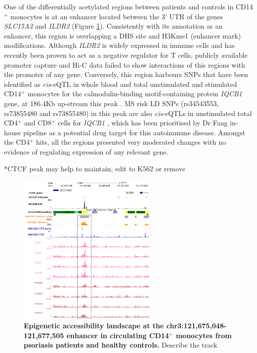 One of the differentially acetylated regions between patients and controls in CD14$^+$ monocytes is at an enhancer located between the 3' UTR of the genes \textit{SLC15A2} and \textit{ILDR2} (Figure \ref{figure:ChIPm_H3K27ac_UCSC_ILDR1_track}). Consistently with its annotation as an enhancer, this region is overlapping a DHS site and H3Kme1 (enhancer mark) modifications. Although \textit{ILDR2} is widely expressed in immune cells and has recently been proven to act as a negative regulator for T cells, publicly available promoter capture and Hi-C data failed to show interactions of this regions with the promoter of any gene. Conversely, this region harbours SNPs that have been identified as \textit{cis}-eQTL in whole blood and total unstimulated and stimulated CD14$^+$ monocytes for the calmodulin-binding motif-containing protein \textit{IQCB1} gene, at 186.4Kb up-stream this peak \parencite{GTeX,Fairfax2014}. MS risk LD SNPs (rs34543553, rs73855480 and rs73855480) in this peak are also \textit{cis}-eQTLs in unstimulated total CD4$^+$ and CD8$^+$ cells for \textit{IQCB1} \parencite{Kasela2017}, which has been prioritised by Dr Fang in-house pipeline as a potential drug target for this autoimmune disease. Amongst the CD4$^+$ hits, all the regions presented very moderated changes with no evidence of regulating expression of any relevant gene.

*CTCF peak may help to maintain, edit to K562 or remove

\begin{figure}[htbp]
\centering
\includegraphics[width=0.6\textwidth]{./Results2/pdfs/ChIPm_H3K27ac_UCSC_CD14_ILDR1_track}
\caption[Epigenetic landscape at the chr3:121,675,048-121,677,505 enhancer in circulating CD14$^+$ monocytes from psoriasis patients and healthy controls.]{\textbf{Epigenetic accessibility landscape at the chr3:121,675,048-121,677,505 enhancer in circulating CD14$^+$ monocytes from psoriasis patients and healthy controls.} Describe the track }
\label{figure:ChIPm_H3K27ac_UCSC_ILDR1_track}
\end{figure}



